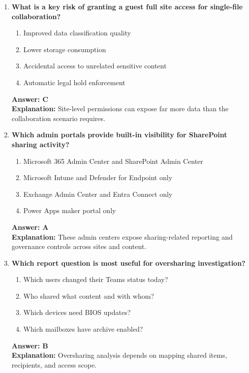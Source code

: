 \documentclass[10pt]{article}
\begin{document}
\begin{enumerate}[leftmargin=*]
\item \textbf{What is a key risk of granting a guest full site access for single-file collaboration?}
\begin{enumerate}[label=\Alph*.]
  \item Improved data classification quality
  \item Lower storage consumption
  \item Accidental access to unrelated sensitive content
  \item Automatic legal hold enforcement
\end{enumerate}
\textbf{Answer: C}\\
\textbf{Explanation:} Site-level permissions can expose far more data than the collaboration scenario requires.

\item \textbf{Which admin portals provide built-in visibility for SharePoint sharing activity?}
\begin{enumerate}[label=\Alph*.]
  \item Microsoft 365 Admin Center and SharePoint Admin Center
  \item Microsoft Intune and Defender for Endpoint only
  \item Exchange Admin Center and Entra Connect only
  \item Power Apps maker portal only
\end{enumerate}
\textbf{Answer: A}\\
\textbf{Explanation:} These admin centers expose sharing-related reporting and governance controls across sites and content.

\item \textbf{Which report question is most useful for oversharing investigation?}
\begin{enumerate}[label=\Alph*.]
  \item Which users changed their Teams status today?
  \item Who shared what content and with whom?
  \item Which devices need BIOS updates?
  \item Which mailboxes have archive enabled?
\end{enumerate}
\textbf{Answer: B}\\
\textbf{Explanation:} Oversharing analysis depends on mapping shared items, recipients, and access scope.


\end{enumerate}
\end{document}
